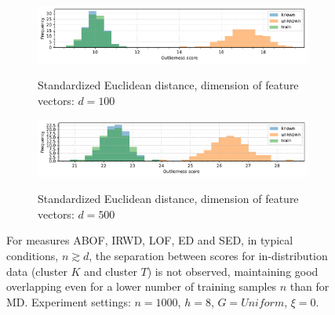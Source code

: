 \begin{figure}[tb]
    \vspace{-2.0em}
    \centering
    \begin{subfigure}[b]{\textwidth}
        \centering
        \caption{\small Standardized Euclidean distance, dimension of feature vectors: $d = 100$}
        \includegraphics[width=\textwidth]{images/distributions/hists-sed-dimensions/hist-distributions-dimension_100-samples_1000-distance_8-distribution_uniform-model_SED-seed_0.pdf}
        \label{fig:hists-sed-100}
    \end{subfigure}
    \begin{subfigure}[b]{\textwidth}
        \centering
        \caption{\small Standardized Euclidean distance, dimension of feature vectors: $d = 500$}
        \includegraphics[width=\textwidth]{images/distributions/hists-sed-dimensions/hist-distributions-dimension_500-samples_1000-distance_8-distribution_uniform-model_SED-seed_0.pdf}
        \label{fig:hists-sed-500}
    \end{subfigure}
    \caption{For measures ABOF, IRWD, LOF, ED and SED, in typical conditions, $n \gtrsim d$, the separation between scores for in-distribution data (cluster $K$ and cluster $T$) is not observed, maintaining good overlapping even for a lower number of training samples $n$ than for MD. Experiment settings: $n = 1000$, $h = 8$, $G = \textit{Uniform}$, $\xi = 0$.}
    \label{fig:hists-sed-dimensions}
\end{figure}
